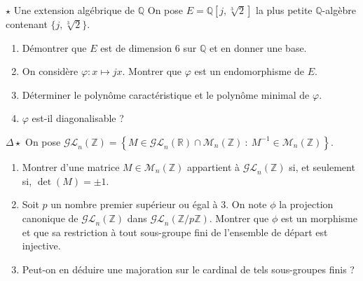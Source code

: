 \documentclass[french,a4paper]{article}
\newcommand{\Z}{\mathbb{Z}}
\newcommand{\Q}{\mathbb{Q}}
\newcommand{\R}{\mathbb{R}}
\newcommand{\inv}{^{-1}}
\theoremstyle{plain}
\theoremstyle{definition}
\theoremstyle{remark}
\begin{document}
\begin{ex}[Châteaux]{$\star$ Une extension algébrique de $\Q$}
	On pose $E=\Q[j,\sqrt[3]{2}]$ la plus petite $\Q$-algèbre contenant $\{j,\sqrt[3]{2}\}$.
	\begin{enumerate}
		\item Démontrer que $E$ est de dimension $6$ sur $\Q$ et en donner une base.
		\item On considère $\varphi :x\mapsto jx$. Montrer que $\varphi$ est un endomorphisme de $E$.
		\item Déterminer le polynôme caractéristique et le polynôme minimal de $\varphi$.
		\item $\varphi$ est-il diagonalisable ?
	\end{enumerate}
\end{ex}

\begin{ex}[Châteaux]{$\Delta\star$}
	On pose $\mathcal{GL}_n(\Z)=\left\{M\in\mathcal{GL}_n(\R)\cap\mathcal{M}_n(\Z)\ :\ M\inv\in\mathcal{M}_n(\Z)\right\}$.
	\begin{enumerate}
		\item Montrer d'une matrice $M\in\mathcal{M}_n(\Z)$ appartient à $\mathcal{GL}_n(\Z)$ si, et seulement si, $\det(M)=\pm1$.
		\item Soit $p$ un nombre premier supérieur ou égal à $3$. On note $\phi$ la projection canonique de $\mathcal{GL}_n(\Z)$ dans $\mathcal{GL}_n(\Z/p\Z)$. Montrer que $\phi$ est un morphisme et que sa restriction à tout sous-groupe fini de l'ensemble de départ est injective.
		\item Peut-on en déduire une majoration sur le cardinal de tels sous-groupes finis ?
	\end{enumerate}
\end{ex}
\end{document}
